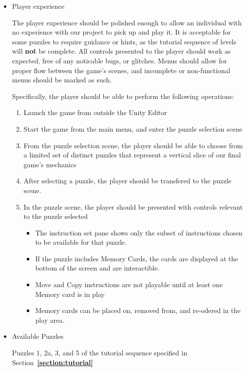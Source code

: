 \begin{itemize}
  \item Player experience
  
  The player experience should be polished enough to allow an individual with no experience with our project to pick up and play it. It is acceptable for some puzzles to require guidance or hints, as the tutorial sequence of levels will \textbf{not} be complete. All controls presented to the player should work as expected, free of any noticable bugs, or glitches. Menus should allow for proper flow between the game's scenes, and incomplete or non-functional menus should be marked as such.

  Specifically, the player should be able to perform the following operations:

  \begin{enumerate}
    \item Launch the game from outside the Unity Editor
    \item Start the game from the main menu, and enter the puzzle selection scene
    \item From the puzzle selection scene, the player should be able to choose from a limited set of distinct puzzles that represent a vertical slice of our final game's mechanics
    \item After selecting a puzzle, the player should be transfered to the puzzle scene.
    \item In the puzzle scene, the player should be presented with controls relevant to the puzzle selected
    \begin{itemize}
      \item The instruction set pane shows only the subset of instructions chosen to be available for that puzzle.
      \item If the puzzle includes Memory Cards, the cards are displayed at the bottom of the screen and are interactible.
      \item Move and Copy instructions are not playable until at least one Memory card is in play
      \item Memory cards can be placed on, removed from, and re-odered in the play area.
    \end{itemize}
  \end{enumerate}


  \item Available Puzzles
  
  Puzzles 1, 2a, 3, and 5 of the tutorial sequence specified in Section~\textbf{\ref{section:tutorial}}


\end{itemize}
